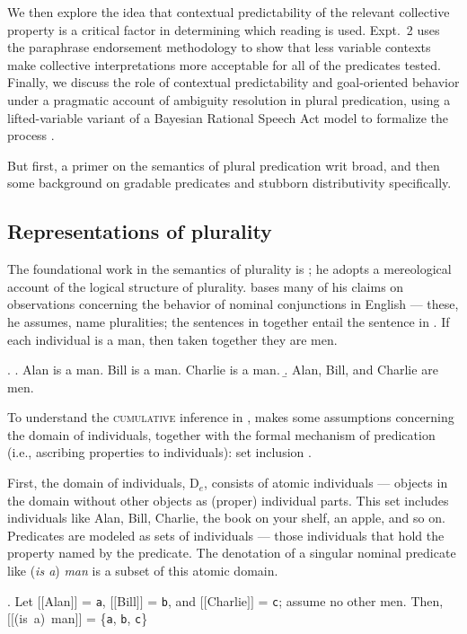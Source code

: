 \documentclass[linguex]{sp}
\newcommand{\sem}[1]{\mbox{$[\![$#1$]\!]$}}
\begin{document}
We then explore the idea that contextual predictability of the relevant collective property is a critical factor in determining which reading is used. Expt.~2 uses the paraphrase endorsement methodology to show that less variable contexts make collective interpretations more acceptable for all of the predicates tested. Finally, we discuss the role of contextual predictability and goal-oriented behavior under a pragmatic account of ambiguity resolution in plural predication, using a lifted-variable variant of a Bayesian Rational Speech Act model to formalize the process \citep{frankgoodman2012,lassitergoodman2013}.

But first, a primer on the semantics of plural predication writ broad, and then some background on gradable predicates and stubborn distributivity specifically.

\subsection{Representations of plurality}

The foundational work in the semantics of plurality is \cite{link1983}; he adopts a mereological account of the logical structure of plurality. \citeauthor{link1983} bases many of his claims on observations concerning the behavior of nominal conjunctions in English --- these, he assumes, name pluralities; the sentences in \Next[a] together entail the sentence in \Next[b]. If each individual is a man, then taken together they are men.

\ex. \label{cumulative}\a. Alan is a man. Bill is a man. Charlie is a man.
\b. Alan, Bill, and Charlie are men.

To understand the \textsc{cumulative} inference in \Last, \citeauthor{link1983} makes some assumptions concerning the domain of individuals, together with the formal mechanism of predication (i.e., ascribing properties to individuals): set inclusion \citep[cf.][]{montague1973}.

First, the domain of individuals, D$_{e}$, consists of atomic individuals --- objects in the domain without other objects as (proper) individual parts. This set includes individuals like Alan, Bill, Charlie, the book on your shelf, an apple, and so on. Predicates are modeled as sets of individuals --- those individuals that hold the property named by the predicate. The denotation of a singular nominal predicate like (\emph{is a}) \emph{man} is a subset of this atomic domain.

\ex. \label{theboys} Let \sem{Alan} = \texttt{a}, \sem{Bill} = \texttt{b}, and \sem{Charlie} = \texttt{c}; assume no other men. Then,\\
 \sem{(is a) man} = \{\texttt{a}, \texttt{b}, \texttt{c}\}
\end{document}
